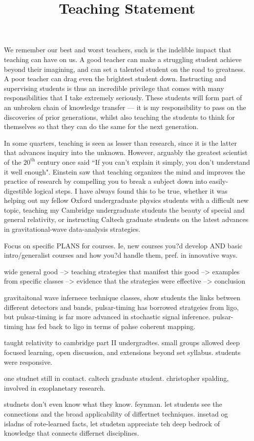 \documentclass[11pt,letterpaper,sans]{moderncv} %
\title{\huge{Teaching Statement}}
\begin{document}
\makecvtitle %

We remember our best and worst teachers, such is the indelible impact that teaching can have on us. A good teacher can make a struggling student achieve beyond their imagining, and can set a talented student on the road to greatness. A poor teacher can drag even the brightest student down. Instructing and supervising students is thus an incredible privilege that comes with many responsibilities that I take extremely seriously. These students will form part of an unbroken chain of knowledge transfer --- it is my responsibility to pass on the discoveries of prior generations, whilst also teaching the students to think for themselves so that they can do the same for the next generation.
\vspace{2mm}

In some quarters, teaching is seen as lesser than research, since it is the latter that advances inquiry into the unknown. However, arguably the greatest scientist of the $20^\mathrm{th}$ century once said ``If you can't explain it simply, you don't understand it well enough". Einstein saw that teaching organizes the mind and improves the practice of research by compelling you to break a subject down into easily-digestible logical steps. I have always found this to be true, whether it was helping out my fellow Oxford undergraduate physics students with a difficult new topic, teaching my Cambridge undergraduate students the beauty of special and general relativity, or instructing Caltech graduate students on the latest advances in gravitational-wave data-analysis strategies.

Focus on specific PLANS for courses. Ie, new courses you?d develop AND basic intro/generalist courses and how you?d handle them, pref. in innovative ways.

wide general good --> teaching strategies that manifest this good --> examples from specific classes --> evidence that the strategies were effective --> conclusion

gravitaitonal wave infernece technique classes, show students the links between different detectors and bands, pulsar-timing has borrowed stratgeies from ligo, but pulsar-timing is far more advanced in stochastic signal inference. pulsar-timing has fed back to ligo in terms of pahse coherent mapping.

taught relativity to cambridge part II undergradtes. small groups allowed deep focused learning, open discussion, and extensions beyond set syllabus. students were responsive. 

one studnet still in contact. caltech graduate student. christopher spalding, involved in exoplanetary research.

studnets don't even know what they know. feynman. let students see the connections and the broad applicability of differtnet techniques. insetad og isladns of rote-learned facts, let studetsn appreciate teh deep bedrock of knowledge that connects differnet disciplines.
\end{document}
